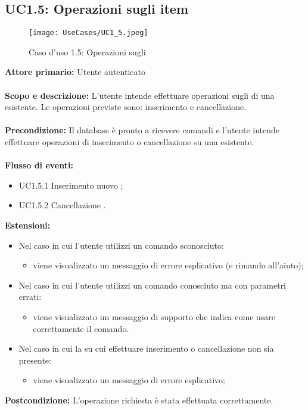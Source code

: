 \documentclass{scalatekids-article}
\begin{document}
\subsection{UC1.5: Operazioni sugli item}
\begin{figure}[H]
  \begin{center}
    \texttt{[image: UseCases/UC1\_5.jpeg]}
    \caption{Caso d'uso 1.5: Operazioni sugli }
  \end{center}
\end{figure}
\textbf{Attore primario:} Utente autenticato\\ \\
\textbf{Scopo e descrizione:} L'utente intende effettuare operazioni sugli  di una  esistente. Le operazioni previste sono:
inserimento e cancellazione.\\ \\
\textbf{Precondizione:} Il database è pronto a ricevere comandi e l'utente intende effettuare operazioni di inserimento o cancellazione su una  esistente.\\ \\
\textbf{Flusso di eventi:}
\begin{itemize}
\item UC1.5.1 Inserimento nuovo ;
\item UC1.5.2 Cancellazione .
\end{itemize}
\textbf{Estensioni:}
\begin{itemize}
\item Nel caso in cui l'utente utilizzi un comando sconosciuto:
  \begin{itemize}
  \item viene visualizzato un messaggio di errore esplicativo (e rimando all'aiuto);
  \end{itemize}
\item Nel caso in cui l'utente utilizzi un comando conosciuto ma con parametri errati:
  \begin{itemize}
  \item viene visualizzato un messaggio di supporto che indica come usare correttamente il comando.
  \end{itemize}
\item Nel caso in cui la  su cui effettuare inserimento o cancellazione non sia presente:
  \begin{itemize}
  \item viene visualizzato un messaggio di errore esplicativo;
  \end{itemize}
\end{itemize}
\textbf{Postcondizione:} L'operazione richiesta è stata effettuata correttamente.
\end{document}
